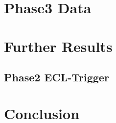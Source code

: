 \documentclass[a4paper,11pt,twosided,final,german,openbib,pdftex,listof=totoc,bibliography=totoc]{scrbook}
\begin{document}
\chapter{Phase3 Data}



\chapter{Further Results}

\section{Phase2 ECL-Trigger}
\label{sec:ECLTriggerPhase2}
\chapter{Conclusion}
\end{document}
